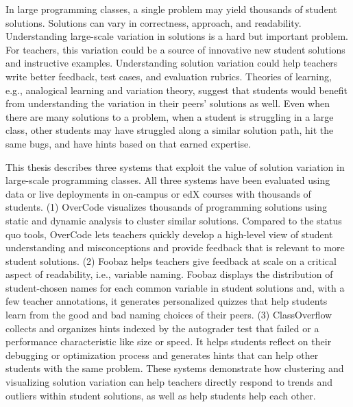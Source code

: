 %
%
%

In large programming classes, a single problem may yield thousands of student solutions. Solutions can vary in correctness, approach, and readability. Understanding large-scale variation in solutions is a hard but important problem. For teachers, this variation could be a source of innovative new student solutions and instructive examples. Understanding solution variation could help teachers write better feedback, test cases, and evaluation rubrics. Theories of learning, e.g., analogical learning and variation theory, suggest that students would benefit from understanding the variation in their peers' solutions as well. Even when there are many solutions to a problem, when a student is struggling in a large class, other students may have struggled along a similar solution path, hit the same bugs, and have hints based on that earned expertise.

This thesis describes three systems that exploit the value of solution variation in large-scale programming classes. All three systems have been evaluated using data or live deployments in on-campus or edX courses with thousands of students. (1) OverCode visualizes thousands of programming solutions using static and dynamic analysis to cluster similar solutions. Compared to the status quo tools, OverCode lets teachers quickly develop a high-level view of student understanding and misconceptions and provide feedback that is relevant to more student solutions. (2) Foobaz helps teachers give feedback at scale on a critical aspect of readability, i.e., variable naming. Foobaz displays the distribution of student-chosen names for each common variable in student solutions and, with a few teacher annotations, it generates personalized quizzes that help students learn from the good and bad naming choices of their peers. (3) ClassOverflow collects and organizes hints indexed by the autograder test that failed or a performance characteristic like size or speed. It helps students reflect on their debugging or optimization process and generates hints that can help other students with the same problem. These systems demonstrate how clustering and visualizing solution variation can help teachers directly respond to trends and outliers within student solutions, as well as help students help each other. %


